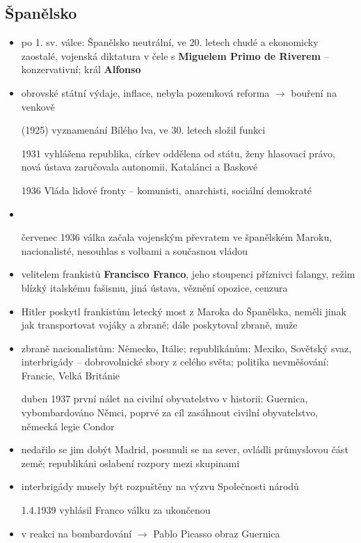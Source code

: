\documentclass{article}
\begin{document}
\subsection*{Španělsko}
\begin{itemize}
    \item po 1. sv. válce: Španělsko neutrální, ve 20. letech chudé a ekonomicky zaostalé, vojenská diktatura v čele s \textbf{Miguelem Primo de Riverem} -- konzervativní; král \textbf{Alfonso}
    \item obrovské státní výdaje, inflace, nebyla pozemková reforma $\rightarrow$ bouření na venkově
    \item[(1925)] vyznamenání Bílého lva, ve 30. letech složil funkci
    \item[1931] vyhlášena republika, církev oddělena od státu, ženy hlasovací právo, nová ústava zaručovala autonomii, Katalánci a Baskové
    \item[1936] Vláda lidové fronty -- komunisti, anarchisti, sociální demokraté
    \item {}
    \item[červenec 1936] válka začala vojenským převratem ve španělském Maroku, nacionalisté, nesouhlas s volbami a současnou vládou
    \item velitelem frankistů \textbf{Francisco Franco}, jeho stoupenci příznivci falangy, režim blízký italskému fašismu, jiná ústava, věznění opozice, cenzura
    \item Hitler poskytl frankistům letecký most z Maroka do Španělska, neměli jinak jak transportovat vojáky a zbraně; dále poskytoval zbraně, muže
    \item zbraně nacionalistům: Německo, Itálie; republikánům: Mexiko, Sovětský svaz, interbrigády -- dobrovolnické sbory z celého světa; politika nevměšování: Francie, Velká Británie
    \item[duben 1937] první nálet na civilní obyvatelstvo v historii: Guernica, vybombardováno Němci, poprvé za cíl zasáhnout civilní obyvatelstvo, německá legie Condor
    \item nedařilo se jim dobýt Madrid, posunuli se na sever, ovládli průmyslovou část země; republikáni oslabení rozpory mezi skupinami
    \item interbrigády musely být rozpuštěny na výzvu Společnosti národů
    \item[1.4.1939] vyhlásil Franco válku za ukončenou
    \item v reakci na bombardování $\rightarrow$ Pablo Picasso obraz Guernica
\end{itemize}
\end{document}
